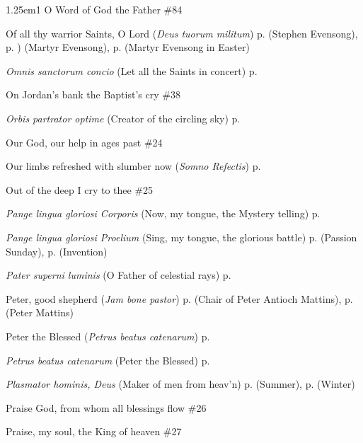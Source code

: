 \begin{hangparas}{1.25em}{1}
O Word of God the Father \dotfill \#84
\par\noindent
Of all thy warrior Saints, O Lord (\textit{Deus tuorum militum}) \dotfill p. \pageref{StephenEvensong} (Stephen Evensong), p. \pageref{MartyrEvensong}) (Martyr Evensong), p. \pageref{MartyrsEvensongEaster} (Martyr Evensong in Easter)
\par\noindent
\textit{Omnis sanctorum concio} (Let all the Saints in concert) \dotfill p. \pageref{AnneIIEvensong}
\par\noindent
On Jordan's bank the Baptist's cry \dotfill \#38
\par\noindent
\textit{Orbis partrator optime} (Creator of the circling sky) \dotfill p. \pageref{GuardianAngelsMattins}
\par\noindent
Our God, our help in ages past \dotfill \#24
\par\noindent
Our limbs refreshed with slumber now (\textit{Somno Refectis}) \dotfill p. \pageref{MondayInvitatory}
\par\noindent
Out of the deep I cry to thee \dotfill \#25
\par\noindent
\textit{Pange lingua gloriosi Corporis} (Now, my tongue, the Mystery telling) \dotfill p. \pageref{CorpusChristiEvensong}
\par\noindent
\textit{Pange lingua gloriosi Proelium} (Sing, my tongue, the glorious battle) \dotfill p. \pageref{PassionInvitatoryHymn} (Passion Sunday), p. \pageref{InventionInvitatory} (Invention)
\par\noindent
\textit{Pater superni luminis} (O Father of celestial rays) \dotfill p. \pageref{MaryMagdaleneEvensong}
\par\noindent
Peter, good shepherd (\textit{Jam bone pastor}) \dotfill p. \pageref{PeterAntiochMattins} (Chair of Peter Antioch Mattins), p. \pageref{PeterMattins} (Peter Mattins)
\par\noindent
Peter the Blessed (\textit{Petrus beatus catenarum}) \dotfill p. \pageref{LammasEvensong}
\par\noindent
\textit{Petrus beatus catenarum} (Peter the Blessed) \dotfill p. \pageref{LammasEvensong}
\par\noindent
\textit{Plasmator hominis, Deus} (Maker of men from heav'n) \dotfill p. \pageref{FridayEvensongSummer} (Summer), p. \pageref{FridayEvensongWinter} (Winter)
\par\noindent
Praise God, from whom all blessings flow \dotfill \#26
\par\noindent
Praise, my soul, the King of heaven \dotfill \#27

\end{hangparas}

